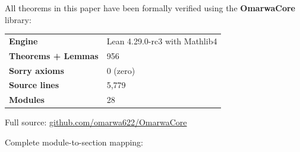 \documentclass[11pt, a4paper]{article}
\theoremstyle{plain}
\theoremstyle{definition}
\theoremstyle{remark}
\begin{document}
All theorems in this paper have been formally verified using the
\textbf{OmarwaCore} library:

\medskip
\begin{center}
\begin{tabular}{@{}ll@{}}
\toprule
\textbf{Engine}       & Lean 4.29.0-rc3 with Mathlib4 \\
\textbf{Theorems + Lemmas} & 956 \\
\textbf{Sorry axioms} & 0 (zero) \\
\textbf{Source lines}  & 5,779 \\
\textbf{Modules}       & 28 \\
\bottomrule
\end{tabular}
\end{center}

\smallskip
\noindent Full source:
\href{https://github.com/omarwa622/OmarwaCore}{github.com/omarwa622/OmarwaCore}

\smallskip
\noindent Complete module-to-section mapping:
\end{document}

